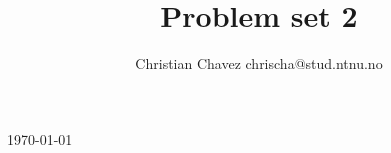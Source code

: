 \documentclass[fontsize=11pt, paper=a4]{article}
\begin{document}
\title{Problem set 2}
\author{Christian Chavez \newline chrischa@stud.ntnu.no}
\today
\end{document}
